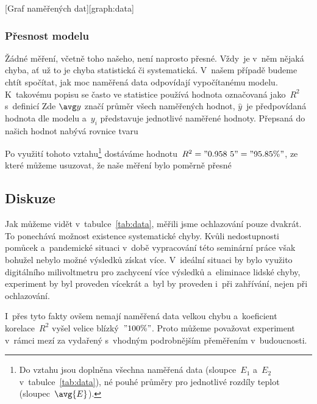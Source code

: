 [Graf naměřených dat][graph:data]


\subsubsection{Přesnost modelu}
\label{sec:presnost}
Žádné měření, včetně toho našeho, není naprosto přesné. Vždy~je v~něm nějaká chyba,
ať už to je chyba statistická či systematická. V~našem případě budeme chtít 
spočítat, jak moc naměřená data odpovídají vypočítanému modelu. K~takovému
popisu se často ve statistice používá hodnota označovaná jako~$R^2$ s~definicí
Zde $\avg y$ značí průměr všech naměřených hodnot, $\hat y$~je předpovídaná
hodnota dle modelu a~$y_i$ představuje jednotlivé naměřené hodnoty. Přepsaná do
našich hodnot nabývá rovnice tvaru

Po využití tohoto vztahu\footnote{Do vztahu jsou doplněna všechna naměřená data
(sloupce~$E_1$ a~$E_2$ v~tabulce~\ref{tab:data}), né pouhé průměry pro
jednotlivé rozdíly teplot (sloupec~$\avg{E}$).} dostáváme 
hodnotu~$R^2 = "0.958~5" = "95.85 \%"$, ze které můžeme usuzovat, že naše 
měření bylo poměrně přesné

\subsection{Diskuze}
Jak můžeme vidět v~tabulce~\ref{tab:data}, měřili jsme ochlazování pouze
dvakrát. To ponechává možnost existence systematické chyby. Kvůli nedostupnosti
pomůcek a~pandemické situaci v~době vypracování této seminární práce však
bohužel nebylo možné výsledků získat více. V~ideální situaci by bylo využito
digitálního milivoltmetru pro zachycení více výsledků a~eliminace lidské chyby,
experiment by byl proveden vícekrát a~byl by proveden i~při zahřívání, nejen
při ochlazování.

I~přes tyto fakty ovšem nemají naměřená data velkou chybu a~koeficient
korelace~$R^2$ vyšel velice blízký~$"100 \%"$. Proto můžeme považovat
experiment v~rámci mezí za vydařený s~vhodným podrobnějším přeměřením
v~budoucnosti.
